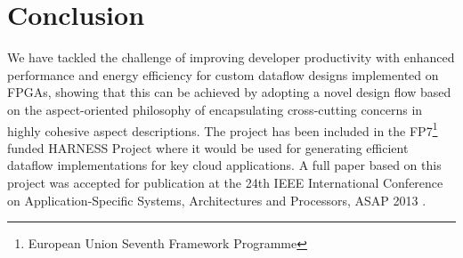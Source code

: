 \section{Conclusion}
\label{sec:conclusion}

We have tackled the challenge of improving developer productivity with
enhanced performance and energy efficiency for custom dataflow designs
implemented on FPGAs, showing that this can be achieved by adopting a
novel design flow based on the aspect-oriented philosophy of
encapsulating cross-cutting concerns in highly cohesive aspect
descriptions. The project has been included in the
FP7\footnote{European Union Seventh Framework Programme} funded
HARNESS Project where it would be used for generating efficient
dataflow implementations for key cloud applications. A full paper
based on this project was accepted for publication at the 24th IEEE
International Conference on Application-Specific Systems,
Architectures and Processors, ASAP 2013 \cite{grigoras2013aspect}.

